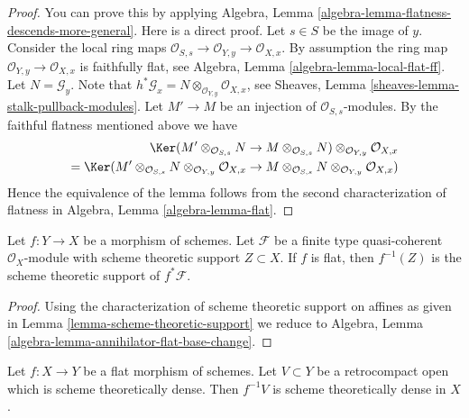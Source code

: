 \begin{proof}
You can prove this by applying
Algebra, Lemma \ref{algebra-lemma-flatness-descends-more-general}.
Here is a direct proof. Let $s \in S$ be the image of $y$.
Consider the local ring maps
$\mathcal{O}_{S, s} \to \mathcal{O}_{Y, y} \to \mathcal{O}_{X, x}$.
By assumption the ring map $\mathcal{O}_{Y, y} \to \mathcal{O}_{X, x}$
is faithfully flat, see
Algebra, Lemma \ref{algebra-lemma-local-flat-ff}.
Let $N = \mathcal{G}_y$. Note that
$h^*\mathcal{G}_x = N \otimes_{\mathcal{O}_{Y, y}} \mathcal{O}_{X, x}$, see
Sheaves, Lemma \ref{sheaves-lemma-stalk-pullback-modules}.
Let $M' \to M$ be an injection of $\mathcal{O}_{S, s}$-modules.
By the faithful flatness mentioned above we have
\begin{align*}
\Ker(
M' \otimes_{\mathcal{O}_{S, s}} N \to M \otimes_{\mathcal{O}_{S, s}} N)
\otimes_{\mathcal{O}_{Y, y}} \mathcal{O}_{X, x} \\
=
\Ker(
M' \otimes_{\mathcal{O}_{S, s}} N
\otimes_{\mathcal{O}_{Y, y}} \mathcal{O}_{X, x}
\to
M \otimes_{\mathcal{O}_{S, s}} N
\otimes_{\mathcal{O}_{Y, y}} \mathcal{O}_{X, x})
\end{align*}
Hence the equivalence of the lemma follows from the second characterization
of flatness in
Algebra, Lemma \ref{algebra-lemma-flat}.
\end{proof}

\begin{lemma}
\label{lemma-flat-pullback-support}
Let $f : Y \to X$ be a morphism of schemes. Let $\mathcal{F}$ be
a finite type quasi-coherent $\mathcal{O}_X$-module with scheme
theoretic support $Z \subset X$. If $f$ is flat,
then $f^{-1}(Z)$ is the scheme theoretic support of $f^*\mathcal{F}$.
\end{lemma}

\begin{proof}
Using the characterization of scheme theoretic support on affines
as given in Lemma \ref{lemma-scheme-theoretic-support} we reduce to
Algebra, Lemma \ref{algebra-lemma-annihilator-flat-base-change}.
\end{proof}

\begin{lemma}
\label{lemma-flat-morphism-scheme-theoretically-dense-open}
Let $f : X \to Y$ be a flat morphism of schemes. Let $V \subset Y$ be
a retrocompact open which is scheme theoretically dense. Then $f^{-1}V$
is scheme theoretically dense in $X$.
\end{lemma}


